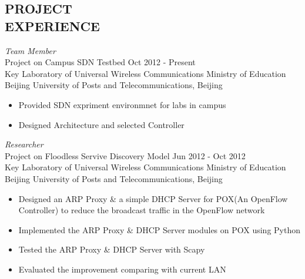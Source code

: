 \documentclass[margin]{res}
\begin{document}
\begin{resume}
 
\section{PROJECT \\ EXPERIENCE} 
    {\sl Team Member} \\
        Project on Campus SDN Testbed
        \hfill Oct 2012 - Present \\
        Key Laboratory of Universal Wireless Communications Ministry of Education \\
        Beijing University of Posts and Telecommunications, Beijing
        \begin{itemize}
            \itemsep -2pt %
            \item Provided SDN expriment environmnet for labs in campus
            \item Designed Architecture and selected Controller
        \end{itemize}

    {\sl Researcher} \\
        Project on Floodless Servive Discovery Model
        \hfill Jun 2012 - Oct 2012 \\ 
        Key Laboratory of Universal Wireless Communications Ministry of Education \\
        Beijing University of Posts and Telecommunications, Beijing
        \begin{itemize}
            \itemsep -2pt %
            \item Designed an ARP Proxy \& a simple DHCP Server for POX(An OpenFlow Controller) to reduce the broadcast traffic in the OpenFlow network
            \item Implemented the ARP Proxy \& DHCP Server modules on POX using Python
            \item Tested the ARP Proxy \& DHCP Server with Scapy
            \item Evaluated the improvement comparing with current LAN 
        \end{itemize}                     

    

\end{resume}
\end{document}

